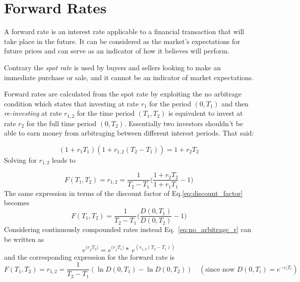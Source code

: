 \section{Forward Rates}
\label{calculating-forward-rates}
A forward rate is an interest rate applicable to a financial transaction that will take place in the future. It can be considered as the market's expectations for future prices and can serve as an indicator of how it believes will perform.

Contrary the \emph{spot rate} is used by buyers and sellers looking to make an immediate purchase or sale, and it cannot be an indicator of market expectations.

Forward rates are calculated from the spot rate by exploiting the no arbitrage condition which states that investing at rate \(r_1\) for the period \((0, T_1)\) and then \emph{re-investing} at rate \(r_{1,2}\) for the time period \((T_1, T_2)\) is equivalent to invest at rate \(r_2\) for the full time period \((0, T_2)\). Essentially two investors shouldn't be able to earn money from arbitraging between different interest periods. That said:

\begin{equation}
(1+r_1 T_1)(1+r_{1,2}(T_2 - T_1)) = 1 + r_2 T_2
\label{eq:no_arbitrage_r}
\end{equation}
Solving for \(r_{1,2}\) leads to

\begin{equation}
F(T_1, T_2) = r_{1,2} = \frac{1}{T_2 - T_1}\Big(\frac{1+r_2 T_2}{1+r_1 T_1} - 1 \Big)
\label{eq:forward_rate_simple}
\end{equation}
\vspace{1cm}
The same expression in terms of the discount factor of Eq.\ref{eq:discount_factor} becomes
\begin{equation}
F(T_1, T_2) = \frac{1}{T_2 - T_1}\Big(\frac{D(0, T_1)}{D(0, T_2)} - 1 \Big)
\end{equation}
Considering continuously compounded rates instead Eq.~\ref{eq:no_arbitrage_r} can be written as
\begin{equation*}
e^{{(r}_{2}T_{2})}=e^{{(r}_{1}T_{1})}\ast \ e^{\left(r_{1,2} \left(T_{2}-T_{1}\right)\right)}
\end{equation*}
and the corresponding expression for the forward rate is
\begin{equation}
F(T_1, T_2) = r_{1,2} = \frac {1}{T_{2}-T_{1}}(\ln D(0,T_{1})-\ln D(0,T_{2}))
\quad(\textrm{since now } D(0, T_i)=e^{-r_i T_i})
\label{eq:forward_rate_continous}
\end{equation}

